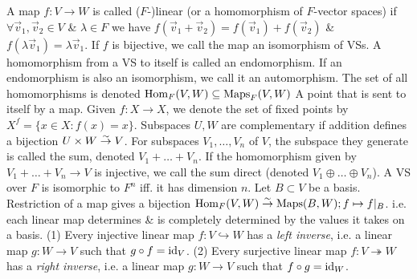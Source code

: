  A map $f : V \to W$ is called ($F$-)linear (or a homomorphism of $F$-vector spaces) if $\forall \vec{v}_{1}, \vec{v}_{2} \in V$ \& $\lambda \in F$ we have $f(\vec{v}_{1} + \vec{v}_{2}) = f(\vec{v}_{1}) + f(\vec{v}_{2})$ \& $f(\lambda \vec{v}_{1}) = \lambda \vec{v}_{1}$. If $f$ is bijective, we call the map an isomorphism of VSs. A homomorphism from a VS to itself is called an endomorphism. If an endomorphism is also an isomorphism, we call it an automorphism. The set of all homomorphisms is denoted $\text{Hom}_{F}(V,W) \subseteq \text{Maps}_{F}(V,W)$
 A point that is sent to itself by a map. Given $f : X \to X$, we denote the set of fixed points by $X^{f} = \{x \in X : f(x) = x\}$.
 Subspaces $U,W$ are complementary if addition defines a bijection $U \times W \stackrel{\sim}{\to} V$.
 For subspaces $V_{1}, \dots, V_{n}$ of $V$, the subspace they generate is called the sum, denoted $V_{1} + \dots + V_{n}$. If the homomorphism given by $V_{1} + \dots + V_{n} \to V$ is injective, we call the sum direct (denoted $V_{1} \oplus \dots \oplus V_{n}$).
 A VS over $F$ is isomorphic to $F^{n}$ iff. it has dimension $n$.
 Let $B \subset V$ be a basis. Restriction of a map gives a bijection $\text{Hom}_{F}(V, W) \stackrel{\sim}{\to} \text{Maps}(B, W); f \mapsto f |_{B}$. i.e. each linear map determines \& is completely determined by the values it takes on a basis.
(1) Every injective linear map $f : V \hookrightarrow W$ has a \emph{left inverse}, i.e. a linear map $g : W \to V$ such that $g \circ f = \text{id}_{V}$.
(2) Every surjective linear map $f : V \twoheadrightarrow W$ has a \emph{right inverse}, i.e. a linear map $g : W \to V$ such that $f \circ g = \text{id}_{W}$.
